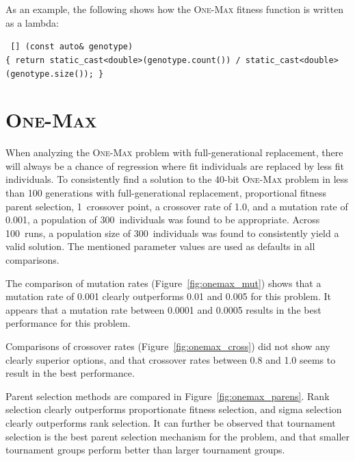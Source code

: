 As an example, the following shows how the \textsc{One-Max} fitness function is written as a lambda:

\begin{center}
{\footnotesize\texttt{
[] (const auto\& genotype)\\
\{ return static\_cast<double>(genotype.count()) / static\_cast<double>(genotype.size()); \}}}
\end{center}

\section*{\textsc{One-Max}}

When analyzing the \textsc{One-Max} problem with full-generational replacement, there will always be a chance of regression where fit individuals are replaced by less fit individuals. To consistently find a solution to the 40-bit \textsc{One-Max} problem in less than 100 generations with full-generational replacement, proportional fitness parent selection, 1~crossover point, a crossover rate of 1.0, and a mutation rate of 0.001, a population of 300~individuals was found to be appropriate. Across 100~runs, a population size of 300~individuals was found to consistently yield a valid solution. The mentioned parameter values are used as defaults in all comparisons.

The comparison of mutation rates (Figure~\ref{fig:onemax_mut}) shows that a mutation rate of 0.001 clearly outperforms 0.01 and 0.005 for this problem. It appears that a mutation rate between 0.0001 and 0.0005 results in the best performance for this problem.

Comparisons of crossover rates (Figure~\ref{fig:onemax_cross}) did not show any clearly superior options, and that crossover rates between 0.8 and 1.0 seems to result in the best performance.

Parent selection methods are compared in Figure~\ref{fig:onemax_parens}. Rank selection clearly outperforms proportionate fitness selection, and sigma selection clearly outperforms rank selection. It can further be observed that tournament selection is the best parent selection mechanism for the problem, and that smaller tournament groups perform better than larger tournament groups.

